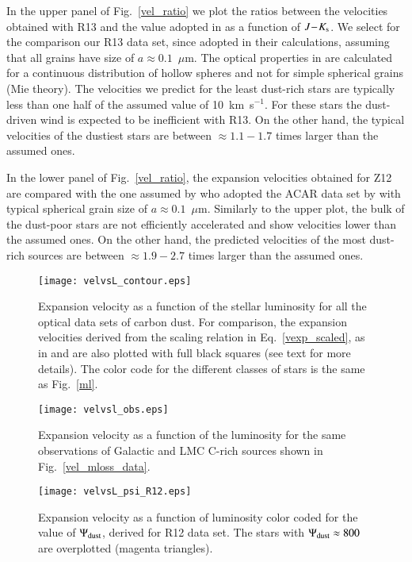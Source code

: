 \documentclass[useAMS,usenatbib]{mn2e/mn2e}
\newcommand{\jks}{\mbox{$J\!-\!K_{\rm s}$}}
\begin{document}
{In the upper panel of Fig.~\ref{vel_ratio} we plot the ratios between the velocities obtained with R13 and the value adopted in \citet{Groenewegen09} as a function of \jks. We select for the comparison our R13 data set, since \citet{Groenewegen09} adopted \citet{Rouleau91} in their calculations, assuming that all grains have size of $a\approx0.1$~$\mu$m. The optical properties in \citet{Groenewegen09} are calculated for a continuous distribution of hollow spheres and not for simple spherical grains (Mie theory).
The velocities we predict for the least dust-rich stars are typically less than one half of the assumed value of 10~km~s$^{-1}$. For these stars the dust-driven wind is expected to be inefficient with R13.
On the other hand, the typical velocities of the dustiest stars are between $\approx1.1-1.7$ times larger than the assumed ones.

In the lower panel of Fig.~\ref{vel_ratio}, the expansion velocities obtained for Z12 are compared with the one assumed by \citet{Srinivasan16} who adopted the ACAR data set by \citet{Zubko96} with typical spherical grain size of $a\approx0.1$~$\mu$m.
Similarly to the upper plot, the bulk of the dust-poor stars are not efficiently accelerated and show velocities lower than the assumed ones. On the other hand, the predicted velocities of the most dust-rich sources are between $\approx1.9-2.7$ times larger than the assumed ones.

\begin{figure*}
\texttt{[image: velvsL\_contour.eps]}
\caption{Expansion velocity as a function of the stellar luminosity for all the optical data sets of carbon dust. For comparison, the expansion velocities derived from the scaling relation in Eq.~\ref{vexp_scaled}, as in \citet{Boyer12} and \citet{Srinivasan16} are also plotted with full black squares (see text for more details). The color code for the different classes of stars is the same as Fig.~\ref{ml}.}
        \label{vel_contour}
        \end{figure*}

\begin{figure}
\texttt{[image: velvsl\_obs.eps]}
        \caption{Expansion velocity as a function of the luminosity for the same observations of Galactic and LMC C-rich sources shown in Fig.~\ref{vel_mloss_data}.}
        \label{vel_data}
        \end{figure}

    \begin{figure}
\texttt{[image: velvsL\_psi\_R12.eps]}
        \caption{Expansion velocity as a function of luminosity color coded for the value of $\Psi_{\rm dust}$, derived for R12 data set. The stars with $\Psi_{\rm dust}\approx 800$ are overplotted (magenta triangles).}
        \label{velvsL_psi}
        \end{figure}
        
}
\end{document}
